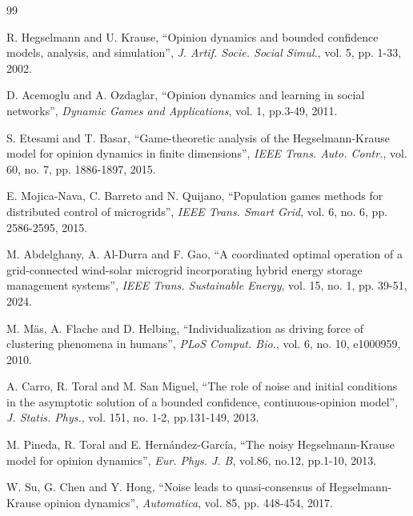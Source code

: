 \documentclass[11pt]{article}
\theoremstyle{definition}
\theoremstyle{remark}
\numberwithin{equation}{section}
\begin{document}
\begin{thebibliography}{99}

R. Hegselmann and U. Krause, ``Opinion dynamics and bounded confidence models, analysis, and simulation'', \emph{J. Artif. Socie. Social Simul.}, vol. 5, pp. 1-33, 2002.

D. Acemoglu and A. Ozdaglar, ``Opinion dynamics and learning in social networks'', \emph{Dynamic Games and Applications}, vol. 1, pp.3-49, 2011.

S. Etesami and T. Basar, ``Game-theoretic analysis of the Hegselmann-Krause model for opinion dynamics in finite dimensions'', \emph{IEEE Trans. Auto. Contr.}, vol. 60, no. 7, pp. 1886-1897, 2015.

E. Mojica-Nava, C. Barreto and N. Quijano, ``Population games methods for distributed control of microgrids'', \emph{IEEE Trans. Smart Grid}, vol. 6, no. 6, pp. 2586-2595, 2015.

M. Abdelghany, A. Al-Durra and F. Gao, ``A coordinated optimal operation of a grid-connected wind-solar microgrid incorporating hybrid
energy storage management systems'', \emph{IEEE Trans. Sustainable Energy}, vol. 15, no. 1, pp. 39-51, 2024.


M. M\"{a}s, A. Flache and D. Helbing, ``Individualization as driving force of clustering phenomena in humans'', \emph{PLoS Comput. Bio.}, vol. 6, no. 10, e1000959, 2010.

A. Carro, R. Toral and M. San Miguel, ``The role of noise and initial conditions in the asymptotic solution of a bounded confidence, continuous-opinion model'', \emph{J. Statis. Phys.}, vol. 151, no. 1-2, pp.131-149, 2013.

M. Pineda, R. Toral and E. Hern\'{a}ndez-Garc\'{i}a, ``The noisy Hegselmann-Krause model for opinion dynamics'', \emph{Eur. Phys. J. B}, vol.86, no.12, pp.1-10, 2013.
%

W. Su, G. Chen and Y. Hong, ``Noise leads to quasi-consensus of Hegselmann-Krause opinion dynamics'', \emph{Automatica}, vol. 85, pp. 448-454, 2017.


\end{thebibliography}
\end{document}
